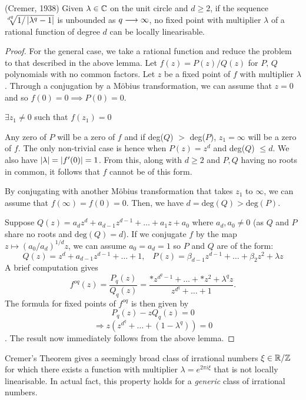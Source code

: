 \documentclass[../main.tex]{subfiles}
\begin{document}
\begin{thm}(Cremer, 1938) \label{thm: 11.2}
Given $\lambda \in \mathbb{C}$ on the unit circle and $d \geq 2$, if the sequence $\sqrt[d^{q}]{1 / \left|\lambda^q - 1\right|}$ is unbounded as $q \longrightarrow \infty$, no fixed point with multiplier $\lambda$ of a rational function of degree $d$ can be locally linearisable.
\end{thm}
\begin{proof}
For the general case, we take a rational function and reduce the problem to that described in the above lemma. Let $f(z) = P(z)/Q(z)$ for $P,\, Q$ polynomials with no common factors. Let $z$ be a fixed point of $f$ with multiplier $\lambda$. Through a conjugation by a M\"obius transformation, we can assume that $z = 0$ and so $f(0) = 0 \implies P(0) = 0$.
\begin{claim}
$\exists z_1 \neq 0$ such that $f(z_1) = 0$
\end{claim}

\begin{subproof}
Any zero of $P$ will be a zero of $f$ and if deg($Q$) $>$ deg($P$), $z_1 = \infty$ will be a zero of $f$. The only non-trivial case is hence when $P(z) = z^d$ and deg($Q$) $\leq d$. We also have $\left|\lambda\right| = |f'(0)| = 1$. From this, along with $d \geq 2$ and $P, Q$ having no roots in common,  it follows that $f$ cannot be of this form.
\end{subproof}

By conjugating with another M\"obius transformation that takes $z_1$ to $\infty$, we can assume that $f(\infty) = f(0) = 0$. Then, we have $d = \text{deg}(Q) > \text{deg}(P)$.

Suppose $Q(z) = a_dz^d + a_{d-1}z^{d-1} + \dots + a_1z + a_0$ where $a_d, a_0 \neq 0$ (as $Q$ and $P$ share no roots and $\text{deg}(Q) = d$). If we conjugate $f$ by the map $z \mapsto (a_0/a_d)^{1/d}z$, we can assume $a_0 = a_d = 1$ so $P$ and $Q$ are of the form: 
\[
Q(z) = z^d + a_{d-1}z^{d-1} + \dots + 1, \;\;\; P(z) = \beta_{d-1}z^{d-1} + \dots + \beta_{2}z^{2} + \lambda z
\]
A brief computation gives
\[
f^{oq}(z) = \frac{P_q(z)}{Q_q(z)} = \frac{*z^{d^q - 1} + \dots + *z^2 + \lambda^{q}z}{z^{d^q} + \dots + 1}.
\]
The formula for fixed points of $f^{oq}$ is then given by
\[
P_{q}(z) - zQ_{q}(z) = 0
\]
\[
\Longrightarrow z(z^{d^q} + \dots + (1 - \lambda^q)) = 0
\].
The result now immediately follows from the above lemma.
\end{proof}

Cremer's Theorem gives a seemingly broad class of irrational numbers $\xi \in \mathbb{R}/\mathbb{Z}$ for which there exists a function with multiplier $\lambda = e^{2\pi i \xi}$ that is not locally linearisable. In actual fact, this property holds for a \textit{generic} class of irrational numbers.
\end{document}
